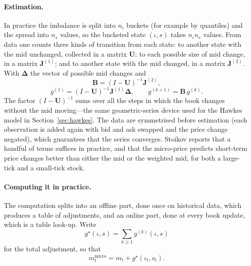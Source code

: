 \paragraph{Estimation.} In practice the imbalance is split into $n_\iota$ buckets (for example by
quantiles) and the spread into $n_s$ values, so the bucketed state $(\iota, s)$ takes $n_\iota n_s$
values. From data one counts three kinds of transition from each state: to another state with the mid
unchanged, collected in a matrix $\mathbf{U}$; to each possible size of mid change, in a matrix
$\mathbf{J}^{(1)}$; and to another state with the mid changed, in a matrix $\mathbf{J}^{(2)}$. With
$\boldsymbol{\Delta}$ the vector of possible mid changes and 
\[
  \mathbf{B} = (I -
\mathbf{U})^{-1}\mathbf{J}^{(2)},
\]
\[
  g^{(1)} = (I - \mathbf{U})^{-1} \mathbf{J}^{(1)} \boldsymbol{\Delta}, \qquad
  g^{(k+1)} = \mathbf{B}\, g^{(k)}.
\]
The factor $(I-\mathbf{U})^{-1}$ sums over all the steps in which the book changes without
the mid moving---the same geometric-series device used for the Hawkes model in Section~\ref{sec:hawkes}. The data
are symmetrised before estimation (each observation is added again with bid and ask swapped and the
price change negated), which guarantees that the series converges. Stoikov reports that a handful
of terms suffices in practice, and that the micro-price predicts short-term price changes better
than either the mid or the weighted mid, for both a large-tick and a small-tick stock.

\paragraph{Computing it in practice.} The computation splits into an offline part, done once on
historical data, which produces a table of adjustments, and an online part, done at every book
update, which is a table look-up. Write 
\[
  g^{\star}(\iota, s) = \sum_{k \ge 1} g^{(k)}(\iota, s)
\]
for
the total adjustment, so that 
\[
  m^{\text{micro}}_t = m_t + g^{\star}(\iota_t, s_t).
\]


